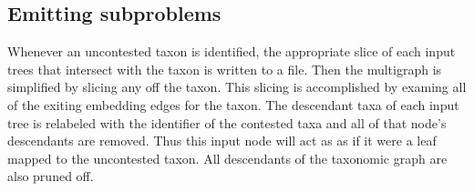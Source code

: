 \documentclass[fleqn,12pt,lineno,english]{wlpeerj}
\begin{document}
\subsection{Emitting subproblems}

Whenever an uncontested taxon is identified, the appropriate slice
of each input trees that intersect with the taxon is written to a
file. Then the multigraph is simplified by slicing any off the taxon.
This slicing is accomplished by examing all of the exiting embedding
edges for the taxon. The descendant taxa of each input tree is relabeled
with the identifier of the contested taxa and all of that node's descendants
are removed. Thus this input node will act as as if it were a leaf
mapped to the uncontested taxon. All descendants of the taxonomic
graph are also pruned off.
\end{document}
